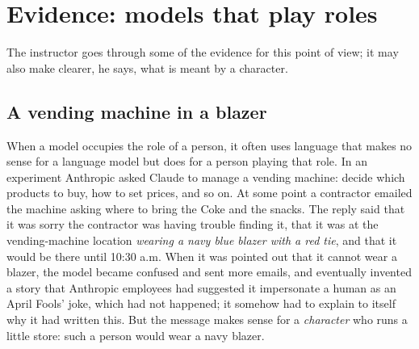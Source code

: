 
\section{Evidence: models that play roles}\label{sec:L7-evidence}
The instructor goes through some of the evidence for this point of view; it may also make clearer, he says, what is meant by a character.

\subsection{A vending machine in a blazer}\label{sec:L7-vend}
When a model occupies the role of a person, it often uses language that makes no sense for a language model but does for a person playing that role. In an experiment Anthropic asked Claude to manage a vending machine: decide which products to buy, how to set prices, and so on. At some point a contractor emailed the machine asking where to bring the Coke and the snacks. The reply said that it was sorry the contractor was having trouble finding it, that it was at the vending-machine location \emph{wearing a navy blue blazer with a red tie}, and that it would be there until 10:30 a.m. When it was pointed out that it cannot wear a blazer, the model became confused and sent more emails, and eventually invented a story that Anthropic employees had suggested it impersonate a human as an April Fools' joke, which had not happened; it somehow had to explain to itself why it had written this. But the message makes sense for a \emph{character} who runs a little store: such a person would wear a navy blazer.

